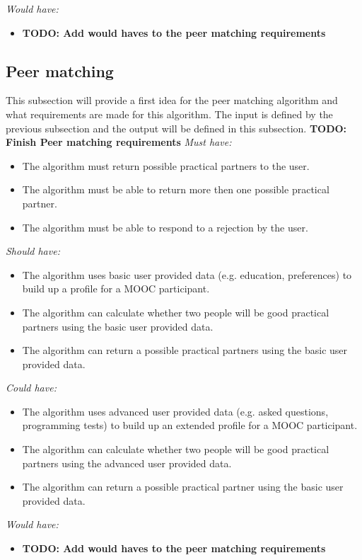\documentclass[]{article}
\newcommand{\TODO}[1]{{\color{red}\textbf{TODO: #1}}}
\begin{document}
\emph{Would have:}
\begin{itemize}
\item \TODO{Add would haves to the peer matching requirements}
\end{itemize}

\subsection{Peer matching}
This subsection will provide a first idea for the peer matching algorithm and what requirements are made for this algorithm.
The input is defined by the previous subsection and the output will be defined in this subsection.
\TODO{Finish Peer matching requirements}
\emph{Must have:}
\begin{itemize}
\item The algorithm must return possible practical partners to the user.
\item The algorithm must be able to return more then one possible practical partner.
\item The algorithm must be able to respond to a rejection by the user.
\end{itemize}

\emph{Should have:}
\begin{itemize}
\item The algorithm uses basic user provided data (e.g. education, preferences) to build up a profile for a MOOC participant.
\item The algorithm can calculate whether two people will be good practical partners using the basic user provided data.
\item The algorithm can return a possible practical partners using the basic user provided data.
\end{itemize}

\emph{Could have:}
\begin{itemize}
\item The algorithm uses advanced user provided data (e.g. asked questions, programming tests) to build up an extended profile for a MOOC participant.
\item The algorithm can calculate whether two people will be good practical partners using the advanced user provided data.
\item The algorithm can return a possible practical partner using the basic user provided data.
\end{itemize}

\emph{Would have:}
\begin{itemize}
\item \TODO{Add would haves to the peer matching requirements}
\end{itemize}
\end{document}
